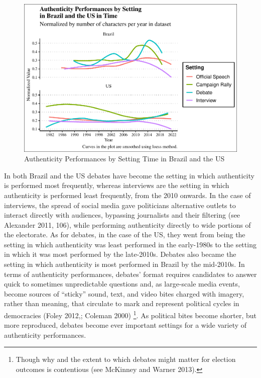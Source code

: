 \documentclass[smallextended]{svjour3}       %
\begin{document}
\begin{figure}
\centering
\includegraphics{antipc_files/figure-latex/Figure 4-1.pdf}
\caption{Authenticity Performances by Setting Time in Brazil and the US}
\end{figure}

In both Brazil and the US debates have become the setting in which
authenticity is performed most frequently, whereas interviews are the
setting in which authenticity is performed least frequently, from the
2010 onwards. In the case of interviews, the spread of social media gave
politicians alternative outlets to interact directly with audiences,
bypassing journalists and their filtering (see Alexander 2011, 106),
while performing authenticity directly to wide portions of the
electorate. As for debates, in the case of the US, they went from being
the setting in which authenticity was least performed in the early-1980s
to the setting in which it was most performed by the late-2010s. Debates
also became the setting in which authenticity is most performed in
Brazil by the mid-2010s. In terms of authenticity performances, debates'
format requires candidates to answer quick to sometimes unpredictable
questions and, as large-scale media events, become sources of ``sticky''
sound, text, and video bites charged with imagery, rather than meaning,
that circulate to mark and represent political cycles in democracies
(Foley 2012,; Coleman 2000) \footnote{Though why and the extent to which
  debates might matter for election outcomes is contentious (see
  McKinney and Warner 2013).}. As political bites become shorter, but
more reproduced, debates become ever important settings for a wide
variety of authenticity performances.
\end{document}
